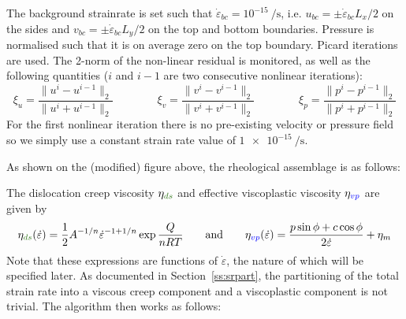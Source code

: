 The background strainrate is set such that $\dot{\varepsilon}_{bc}=10^{-15}~\si{\per\second}$, i.e. 
$u_{bc}=\pm \dot{\varepsilon}_{bc} L_x/2$ on the sides and $v_{bc}=\pm \dot{\varepsilon}_{bc} L_y/2 $
on the top and bottom boundaries. Pressure is normalised such that it is on average zero on the top boundary. 
Picard iterations are used. The 2-norm of the non-linear residual 
is monitored, as well as the following quantities ($i$ and $i-1$ are two consecutive nonlinear iterations):
\[
\xi_u = \frac{\|u^i-u^{i-1}\|_2}{ \|u^i+u^{i-1}\|_2}
\qquad
\qquad
\xi_v = \frac{\|v^i-v^{i-1}\|_2}{ \|v^i+v^{i-1}\|_2}
\qquad
\qquad
\xi_p = \frac{\|p^i-p^{i-1}\|_2}{ \|p^i+p^{i-1}\|_2}
\] 
For the first nonlinear iteration there is no pre-existing velocity or pressure field so 
we simply use a constant strain rate value of $\SI{1e-15}{\per\second}$.


As shown on the (modified) figure above, the rheological assemblage is as follows:
\begin{center}

\end{center}
The dislocation creep viscosity $\eta_{\color{OliveGreen}ds}$ and effective 
viscoplastic viscosity $\eta_{\color{blue}vp}$ are given by 
\[
\eta_{\color{OliveGreen}ds}(\dot\varepsilon) 
= \frac{1}{2} A^{-1/n} \dot{\varepsilon}^{-1+1/n} \exp \frac{Q}{nRT}
\qquad
\text{and}
\qquad
\eta_{\color{blue}vp}(\dot\varepsilon) 
= \frac{p \sin \phi + c \cos \phi}{2 \dot{\varepsilon}}  + \eta_{m}
\]
Note that these expressions are functions of $\dot\varepsilon$, the nature of which will be specified later. 
As documented in Section~\ref{ss:srpart}, 
the partitioning of the total strain rate into a viscous creep component and a viscoplastic component 
is not trivial.  
The algorithm then works as follows:

